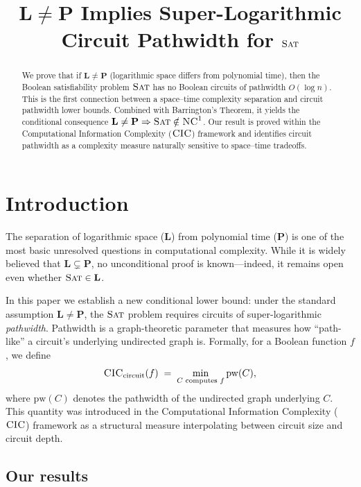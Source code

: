 \documentclass[11pt]{article}
\newcommand{\SAT}{\textsc{Sat}}
\newcommand{\CIC}{\textsc{CIC}}
\newcommand{\pw}{\mathrm{pw}}
\newcommand{\NC}{\textsc{NC}}
\begin{document}
\title{$\mathbf{L \neq P}$ Implies Super-Logarithmic Circuit Pathwidth for $\SAT$}
\author{}
\date{}

\maketitle

\begin{abstract}
  We prove that if $\mathbf{L} \neq \mathbf{P}$ (logarithmic space differs from
  polynomial time), then the Boolean satisfiability problem $\SAT$ has no
  Boolean circuits of pathwidth $O(\log n)$.  This is the first connection
  between a space--time complexity separation and circuit pathwidth lower
  bounds.  Combined with Barrington's Theorem, it yields the conditional
  consequence $\mathbf{L} \neq \mathbf{P} \Rightarrow \SAT \notin \NC^1$.  Our
  result is proved within the Computational Information Complexity ($\CIC$)
  framework and identifies circuit pathwidth as a complexity measure naturally
  sensitive to space--time tradeoffs.
\end{abstract}

\section{Introduction}

The separation of logarithmic space ($\mathbf{L}$) from polynomial time
($\mathbf{P}$) is one of the most basic unresolved questions in computational
complexity.  While it is widely believed that $\mathbf{L} \subsetneq \mathbf{P}$,
no unconditional proof is known---indeed, it remains open even whether
$\SAT \in \mathbf{L}$.

In this paper we establish a new conditional lower bound: under the standard
assumption $\mathbf{L} \neq \mathbf{P}$, the $\SAT$ problem requires circuits
of super-logarithmic \emph{pathwidth}.  Pathwidth is a graph-theoretic
parameter that measures how ``path-like'' a circuit's underlying undirected
graph is.  Formally, for a Boolean function $f$, we define
\[
  \CIC_{\text{circuit}}(f)
  \;=\; \min_{C \text{ computes } f} \pw(C),
\]
where $\pw(C)$ denotes the pathwidth of the undirected graph underlying $C$.
This quantity was introduced in the Computational Information Complexity
($\CIC$) framework as a structural measure interpolating between circuit
size and circuit depth.

\subsection*{Our results}
\end{document}
